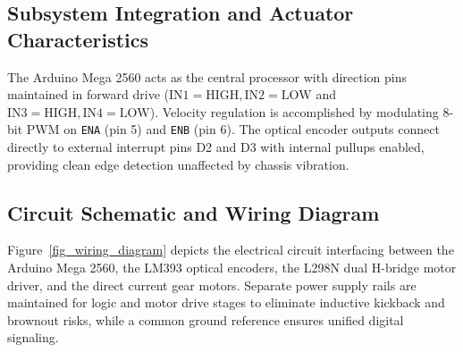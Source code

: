 \documentclass[11pt,a4paper]{article}
\begin{document}
\vspace{0.15cm}
\subsection{Subsystem Integration and Actuator Characteristics}
The Arduino Mega 2560 acts as the central processor with direction pins maintained in forward drive ($\text{IN1}=\text{HIGH}, \text{IN2}=\text{LOW}$ and $\text{IN3}=\text{HIGH}, \text{IN4}=\text{LOW}$). Velocity regulation is accomplished by modulating 8-bit PWM on \texttt{ENA} (pin 5) and \texttt{ENB} (pin 6). The optical encoder outputs connect directly to external interrupt pins D2 and D3 with internal pullups enabled, providing clean edge detection unaffected by chassis vibration.

\newpage
\subsection{Circuit Schematic and Wiring Diagram}
Figure~\ref{fig_wiring_diagram} depicts the electrical circuit interfacing between the Arduino Mega 2560, the LM393 optical encoders, the L298N dual H-bridge motor driver, and the direct current gear motors. Separate power supply rails are maintained for logic and motor drive stages to eliminate inductive kickback and brownout risks, while a common ground reference ensures unified digital signaling.
\end{document}
